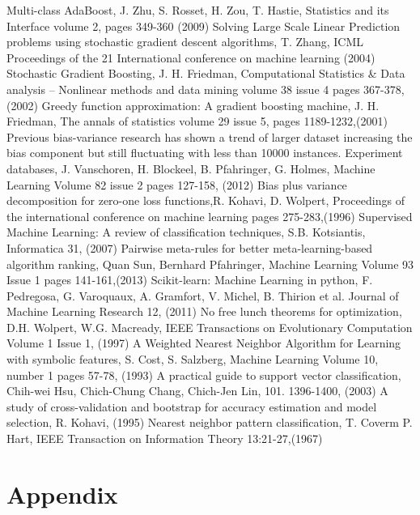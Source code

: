 \documentclass[a4paper,10pt]{article}
\begin{document}
\begin{thebibliography}{9}
 Multi-class AdaBoost, J. Zhu, S. Rosset, H. Zou, T. Hastie, Statistics and its Interface volume 2, pages 349-360 (2009)
 Solving Large Scale Linear Prediction problems using stochastic gradient descent algorithms, T. Zhang, ICML Proceedings of the 21 International conference on machine learning (2004)
 Stochastic Gradient Boosting, J. H. Friedman,  Computational Statistics \& Data analysis – Nonlinear methods and data mining volume 38 issue 4 pages 367-378,(2002)
 Greedy function approximation: A gradient boosting machine, J. H. Friedman, The annals of statistics volume 29 issue 5, pages 1189-1232,(2001)
Previous bias-variance research has shown a trend of larger dataset increasing the bias component but still fluctuating with  less than 10000 instances.
 Experiment databases, J. Vanschoren, H. Blockeel, B. Pfahringer, G. Holmes, Machine Learning Volume 82 issue 2 pages 127-158, (2012)
 Bias plus variance decomposition for zero-one loss functions,R. Kohavi, D. Wolpert, Proceedings of the international conference on machine learning pages 275-283,(1996)
 Supervised Machine Learning: A review of classification techniques, S.B. Kotsiantis, Informatica 31, (2007)
 Pairwise meta-rules for better meta-learning-based algorithm ranking, Quan Sun, Bernhard Pfahringer, Machine Learning Volume 93 Issue 1 pages 141-161,(2013)
 Scikit-learn: Machine Learning in python, F. Pedregosa, G. Varoquaux, A. Gramfort, V. Michel, B. Thirion et al. Journal of Machine Learning Research 12, (2011)
 No free lunch theorems for optimization, D.H. Wolpert, W.G. Macready, IEEE Transactions on Evolutionary Computation Volume 1 Issue 1, (1997)
 A Weighted Nearest Neighbor Algorithm for Learning with symbolic features, S. Cost, S. Salzberg, Machine Learning Volume 10, number 1 pages 57-78, (1993)
 A practical guide to support vector classification, Chih-wei Hsu, Chich-Chung Chang, Chich-Jen Lin, 101. 1396-1400, (2003)
 A study of cross-validation and bootstrap for accuracy estimation and model selection, R. Kohavi, (1995)
 Nearest neighbor pattern classification, T. Coverm P. Hart, IEEE Transaction on Information Theory 13:21-27,(1967)


 
     
\end{thebibliography}
\endgroup

\section{Appendix}
\end{document}

